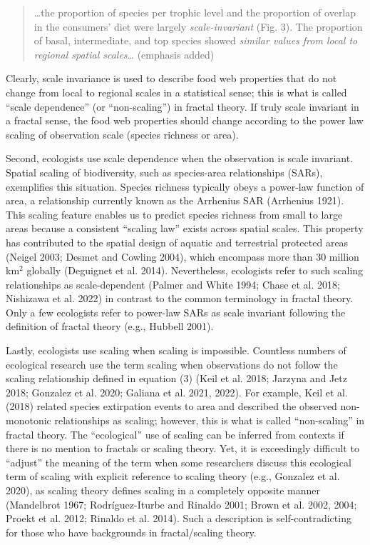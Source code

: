 \documentclass[
  12pt,
]{article}
\begin{document}
\begin{quote}
\ldots the proportion of species per trophic level and the proportion of overlap in the consumers' diet were largely \emph{scale-invariant} (Fig. 3). The proportion of basal, intermediate, and top species showed \emph{similar values from local to regional spatial scales}\ldots{} (emphasis added)
\end{quote}

Clearly, scale invariance is used to describe food web properties that do not change from local to regional scales in a statistical sense; this is what is called ``scale dependence'' (or ``non-scaling'') in fractal theory. If truly scale invariant in a fractal sense, the food web properties should change according to the power law scaling of observation scale (species richness or area).

Second, ecologists use scale dependence when the observation is scale invariant. Spatial scaling of biodiversity, such as species-area relationships (SARs), exemplifies this situation. Species richness typically obeys a power-law function of area, a relationship currently known as the Arrhenius SAR (Arrhenius 1921). This scaling feature enables us to predict species richness from small to large areas because a consistent ``scaling law'' exists across spatial scales. This property has contributed to the spatial design of aquatic and terrestrial protected areas (Neigel 2003; Desmet and Cowling 2004), which encompass more than 30 million km\(^2\) globally (Deguignet et al. 2014). Nevertheless, ecologists refer to such scaling relationships as scale-dependent (Palmer and White 1994; Chase et al. 2018; Nishizawa et al. 2022) in contrast to the common terminology in fractal theory. Only a few ecologists refer to power-law SARs as scale invariant following the definition of fractal theory (e.g., Hubbell 2001).

Lastly, ecologists use scaling when scaling is impossible. Countless numbers of ecological research use the term scaling when observations do not follow the scaling relationship defined in equation (3) (Keil et al. 2018; Jarzyna and Jetz 2018; Gonzalez et al. 2020; Galiana et al. 2021, 2022). For example, Keil et al. (2018) related species extirpation events to area and described the observed non-monotonic relationships as scaling; however, this is what is called ``non-scaling'' in fractal theory. The ``ecological'' use of scaling can be inferred from contexts if there is no mention to fractals or scaling theory. Yet, it is exceedingly difficult to ``adjust'' the meaning of the term when some researchers discuss this ecological term of scaling with explicit reference to scaling theory (e.g., Gonzalez et al. 2020), as scaling theory defines scaling in a completely opposite manner (Mandelbrot 1967; Rodríguez-Iturbe and Rinaldo 2001; Brown et al. 2002, 2004; Proekt et al. 2012; Rinaldo et al. 2014). Such a description is self-contradicting for those who have backgrounds in fractal/scaling theory.
\end{document}
